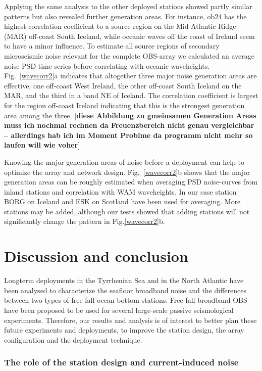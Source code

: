 \documentclass{article}
\providecommand{\remark}[1]{{[\bf #1]}}
\begin{document}
{Applying the same analysis to the other deployed stations 
showed partly similar patterns but also revealed further
generation areas.
For instance, ob24 has the highest 
correlation coefficient to a source region on the Mid-Atlantic Ridge 
(MAR) 
off-coast South Iceland, while oceanic waves off the coast of Ireland 
seem to have a minor influence.
To estimate all source regions of secondary microseismic noise 
relevant for the complete OBS-array we calculated an average 
noise PSD time series before correlating with oceanic 
waveheights.
Fig.~\ref{wavecorr2}a indicates that altogether three major
noise generation areas are effective, 
one off-coast West Ireland, the other off-coast South Iceland on the MAR,
and the third in a band NE of Iceland.
The correlation coefficient is largest for the region 
off-coast Ireland indicating that this  
is the strongest generation area among the three.
\remark{diese Abbildung zu gmeinsamen Generation Areas 
muss ich nochmal rechnen da Freuenzbereich
nicht genau vergleichbar -- allerdings hab ich im Moment Problme da
programm nicht mehr so laufen will wie voher}

Knowing the major generation areas of noise before a deployment 
can help to optimize the array and network design. 
Fig.~\ref{wavecorr2}b shows that the major generation areas
can be roughly estimated when averaging PSD noise-curves from 
inland stations and correlation with WAM waveheights.
In our case station BORG on Iceland and 
ESK on Scotland have been used for averaging.
More stations may be added, although our tests showed that adding stations 
will not significantly change the 
pattern in Fig.\ref{wavecorr2}b.

\section{Discussion and conclusion}
Longterm deployments in the Tyrrhenian Sea and in the North Atlantic 
have been analysed to characterize the 
seafloor broadband noise and the differences between two types
of free-fall ocean-bottom stations.
Free-fall broadband OBS have been proposed to be 
used for several large-scale 
passive seismological experiments.
Therefore, our results and analysis is of interest to 
better plan these future experiments and deployments, to 
improve the station design, the array configuration and 
the deployment technique.

\subsubsection*{The role of the station design and current-induced noise}

}
\end{document}
